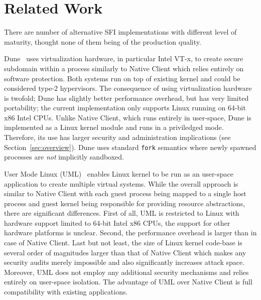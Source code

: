 \section{Related Work}
\label{sec:related}

There are number of alternative SFI implementations with different level
of maturity, thought none of them being of the production quality.



Dune~\cite{belay:osdi12} uses virtualization hardware, in particular
Intel VT-x, to create secure subdomain within a process similarly to
Native Client which relies entirely on software protection. Both
systems run on top of existing kernel and could be considered type-2
hypervisors. The consequence of using virtualization hardware is
twofold; Dune has slightly better performance overhead, but has very
limited portability; the current implementation only supports Linux
running on 64-bit x86 Intel CPUs. Unlike Native Client, which runs
entirely in user-space, Dune is implemented as a Linux kernel module and
runs in a priviledged mode. Therefore, its use has larger security and
administration implications (see Section~\ref{sec:overview}). Dune uses
standard \lstinline`fork` semantics where newly spawned processes are
\emph{not} implicitly sandboxed.

User Mode Linux (UML)~\cite{uml:linux06} enables Linux kernel to be run as
an user-space application to create multiple virtual systems. While the
overall approach is similar to Native Client with each guest process being
mapped to a single host process and guest kernel being responsible for
providing resource abstractions, there are significant differences.
First of all, UML is restricted to Linux with hardware support limited
to 64-bit Intel x86 CPUs, the support for other hardware platforms is
unclear. Second, the performance overhead is larger than in case of
Native Client. Last but not least, the size of Linux kernel code-base is
several order of magnitudes larger than that of Native Client which
makes any security audits merely impossible and also significantly
increases attack space. Moreover, UML does not employ any additional
security mechanisms and relies entirely on user-space isolation. The
advantage of UML over Native Client is full compatibility with existing
applications.

\cite{heiser:hotos11}
\cite{tanenbaum:osdi08}
\cite{engler:sosp95}
\cite{yee:ieee-sp09}
\cite{sehr:usenix-sec10}
\cite{ansel:pldi11}
\cite{donovan:pnacl10}
